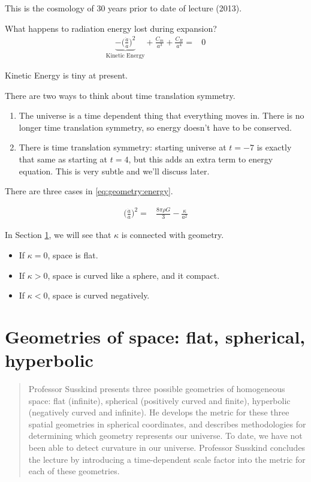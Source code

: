 \documentclass[]{article}
\begin{document}
This is the cosmology of 30 years prior to date of lecture (2013).

What happens to radiation energy lost during expansion?
\begin{align*}
	\underbrace{- \big(\frac{\dot{a}}{a}\big)^2}_\text{Kinetic Energy} + \frac{C_m}{a^3} +\frac{C_R}{a^4} =& 0 
\end{align*}

Kinetic Energy is  tiny at present.

There are two ways to think about time translation symmetry.
\begin{enumerate}
	\item The universe is a time dependent thing that everything moves in. There is no longer time translation symmetry, so energy doesn't have to be conserved.
	\item There is time translation symmetry: starting universe at $t=-7$ is exactly that same as starting at $t=4$, but this adds an extra term to energy equation. This is very subtle and we'll discuss later.
\end{enumerate}

There are three cases in \eqref{eq:geometry:energy}.

\begin{align*}
	\big(\frac{\dot{a}}{a}\big)^2  =& \frac{8\pi\rho G}{3} - \frac{\kappa}{a^2} 
\end{align*}

In Section \ref{sec:geometries}, we will see that $\kappa$ is connected with geometry.
\begin{itemize}
	\item If $\kappa=0$, space is flat.
	\item If $\kappa>0$, space is curved like a sphere, and it compact.
	\item If $\kappa<0$, space is curved negatively.
\end{itemize}


\section{Geometries of space: flat, spherical, hyperbolic} \label{sec:geometries}

\begin{quotation}
	Professor Susskind presents three possible geometries of homogeneous space: flat (infinite), spherical (positively curved and finite), hyperbolic (negatively curved and infinite). He develops the metric for these three spatial geometries in spherical coordinates, and describes methodologies for determining which geometry represents our universe. To date, we have not been able to detect curvature in our universe. Professor Susskind concludes the lecture by introducing a time-dependent scale factor into the metric for each of these geometries.
\end{quotation}
\end{document}
